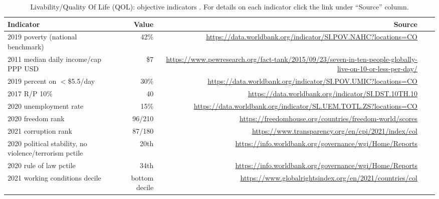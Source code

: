 \documentclass[10pt, letterpaper]{article}
\begin{document}
\begin{spacing}{2}
 
\begin{table}[H]\centering\tiny
\caption{\label{tab1} Livability/Quality Of Life (QOL): objective indicators%
  . For details on each indicator click the link under ``Source'' column.}
\begin{tabular} {@{} lrrrr @{}}   \hline 
Indicator&Value  & Source   \\ \hline
2019 poverty (national benchmark)&42\%&   {\tiny\url{https://data.worldbank.org/indicator/SI.POV.NAHC?locations=CO}}\\
2011 median daily income/cap PPP USD&\$7&{\tiny\url{https://www.pewresearch.org/fact-tank/2015/09/23/seven-in-ten-people-globally-live-on-10-or-less-per-day/}}        \\
2019 percent on $<$\$5.5/day&30\%&{\tiny\url{https://data.worldbank.org/indicator/SI.POV.UMIC?locations=CO}}
\\
2017 R/P 10\%&    40&
                      {\tiny\url{https://data.worldbank.org/indicator/SI.DST.10TH.10}}%
  \\
2020 unemployment rate&    15\%&        {\tiny\url{https://data.worldbank.org/indicator/SL.UEM.TOTL.ZS?locations=CO}}\\
2020 freedom rank&   96/210%
                 &        {\tiny\url{https://freedomhouse.org/countries/freedom-world/scores}}\\
2021 corruption rank&   87/180 %
                 &{\tiny\url{https://www.transparency.org/en/cpi/2021/index/col}}        \\
2020 political stability, no violence/terrorism  pctile&  20th& {\tiny\url{https://info.worldbank.org/governance/wgi/Home/Reports}}\\
2020 rule of law pctile&  34th&    {\tiny\url{https://info.worldbank.org/governance/wgi/Home/Reports}}   \\ 
2021 working conditions decile&   bottom decile&       {\tiny\url{https://www.globalrightsindex.org/en/2021/countries/col}}\\

\end{tabular}
\end{table}
\end{spacing}
\end{document}
